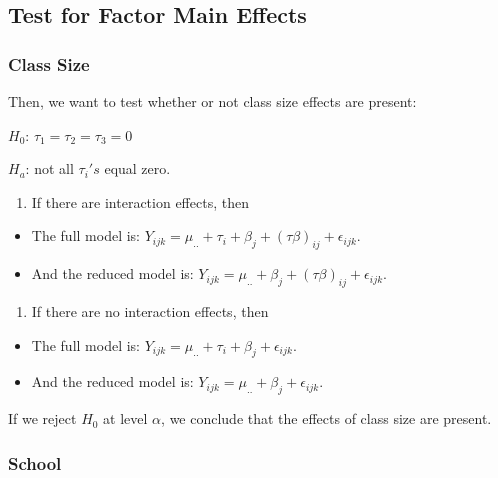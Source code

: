 \documentclass[]{article}
\providecommand{\tightlist}{%
  \setlength{\itemsep}{0pt}\setlength{\parskip}{0pt}}
\begin{document}
\hypertarget{test-for-factor-main-effects}{%
\subsection{Test for Factor Main Effects}\label{test-for-factor-main-effects}}

\hypertarget{class-size}{%
\subsubsection{Class Size}\label{class-size}}

Then, we want to test whether or not class size effects are present:

\(H_0\): \(\tau_1 = \tau_2 = \tau_3 = 0\)

\(H_a\): not all \(\tau_i's\) equal zero.

\begin{enumerate}
\def\labelenumi{(\arabic{enumi})}
\tightlist
\item
  If there are interaction effects, then
\end{enumerate}

\begin{itemize}
\item
  The full model is: \(Y_{ijk} = \mu_{..} + \tau_i + \beta_j + (\tau\beta)_{ij} +\epsilon_{ijk}\).
\item
  And the reduced model is: \(Y_{ijk} = \mu_{..} + \beta_j + (\tau\beta)_{ij} +\epsilon_{ijk}\).
\end{itemize}

\begin{enumerate}
\def\labelenumi{(\arabic{enumi})}
\setcounter{enumi}{1}
\tightlist
\item
  If there are no interaction effects, then
\end{enumerate}

\begin{itemize}
\item
  The full model is: \(Y_{ijk} = \mu_{..} + \tau_i + \beta_j + \epsilon_{ijk}\).
\item
  And the reduced model is: \(Y_{ijk} = \mu_{..} + \beta_j + \epsilon_{ijk}\).
\end{itemize}

If we reject \(H_0\) at level \(\alpha\), we conclude that the effects of class size are present.

\hypertarget{school}{%
\subsubsection{School}\label{school}}
\end{document}
